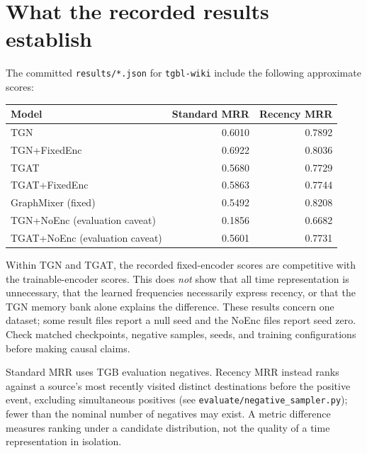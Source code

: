 \documentclass[11pt]{article}
\begin{document}
\section{What the recorded results establish}
The committed \texttt{results/*.json} for \texttt{tgbl-wiki} include the following approximate scores:
\begin{center}
\begin{tabular}{lrr}
\toprule
Model & Standard MRR & Recency MRR\\
\midrule
TGN & 0.6010 & 0.7892\\
TGN+FixedEnc & 0.6922 & 0.8036\\
TGAT & 0.5680 & 0.7729\\
TGAT+FixedEnc & 0.5863 & 0.7744\\
GraphMixer (fixed) & 0.5492 & 0.8208\\
TGN+NoEnc (evaluation caveat) & 0.1856 & 0.6682\\
TGAT+NoEnc (evaluation caveat) & 0.5601 & 0.7731\\
\bottomrule
\end{tabular}
\end{center}
Within TGN and TGAT, the recorded fixed-encoder scores are competitive with the trainable-encoder scores. This does \emph{not} show that all time representation is unnecessary, that the learned frequencies necessarily express recency, or that the TGN memory bank alone explains the difference. These results concern one dataset; some result files report a null seed and the NoEnc files report seed zero. Check matched checkpoints, negative samples, seeds, and training configurations before making causal claims.

Standard MRR uses TGB evaluation negatives. Recency MRR instead ranks against a source's most recently visited distinct destinations before the positive event, excluding simultaneous positives (see \texttt{evaluate/negative\_sampler.py}); fewer than the nominal number of negatives may exist. A metric difference measures ranking under a candidate distribution, not the quality of a time representation in isolation.
\end{document}
